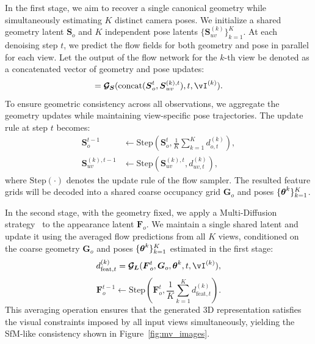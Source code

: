 \documentclass[../../book-main.tex]{subfiles}
\begin{document}
In the first stage, we aim to recover a single canonical geometry
while simultaneously estimating $K$ distinct camera poses. We
initialize a shared geometry latent $\boldsymbol{S}_{o}$ and $K$
independent pose latents $\{ \boldsymbol{S}_{uv}^{(k)} \}_{k=1}^K$.
At each denoising step $t$, we predict the flow fields for both
geometry and pose in parallel for each view. Let the output of the
flow network for the $k$-th view be denoted as a concatenated vector
of geometry and pose updates:
\begin{equation}
[d_{o, t}^{(k)}, d_{uv, t}^{(k)}] =
\sflow(\text{concat}(\boldsymbol{S}_{o}^t, \boldsymbol{S}_{uv}^{(k),
t}), t, \image^{(k)}).
\end{equation}
To ensure geometric consistency across all observations, we aggregate
the geometry updates while maintaining view-specific pose
trajectories. The update rule at step $t$ becomes:
\begin{align}
\boldsymbol{S}_{o}^{t-1} &\leftarrow
\text{Step}\left(\boldsymbol{S}_{o}^{t}, \frac{1}{K} \sum_{k=1}^K
d_{o, t}^{(k)}\right), \\
\boldsymbol{S}_{uv}^{(k), t-1} &\leftarrow
\text{Step}\left(\boldsymbol{S}_{uv}^{(k), t}, d_{uv, t}^{(k)}\right),
\end{align}
where $\text{Step}(\cdot)$ denotes the update rule of the flow
sampler. The resulted feature grids will be decoded into a shared
coarse occupancy grid $\boldsymbol{G}_o$ and poses $\{\boldsymbol{\theta}^{k}\}_{k=1}^{K}$.

In the second stage, with the geometry fixed, we apply a
Multi-Diffusion strategy~\citep{bar2023multidiffusion} to the
appearance latent $\boldsymbol{F}_{o}$. We maintain a single shared
latent and update it using the averaged flow predictions from all $K$
views, conditioned on the coarse geometry $\boldsymbol{G}_o$ and
poses $\{\boldsymbol{\theta}^{k}\}_{k=1}^{K}$ estimated in the first stage:
\begin{equation}
d_{\text{feat}, t}^{(k)} = \lflow(\boldsymbol{F}_{o}^t,
\boldsymbol{G}_o, \pose^{k}, t, \image^{(k)}),
\end{equation}
\begin{equation}
\boldsymbol{F}_{o}^{t-1} \leftarrow
\text{Step}\left(\boldsymbol{F}_{o}^{t}, \frac{1}{K} \sum_{k=1}^K
d_{\text{feat}, t}^{(k)}\right).
\end{equation}
This averaging operation ensures that the generated 3D representation
satisfies the visual constraints imposed by all input views
simultaneously, yielding the SfM-like consistency shown in
Figure~\ref{fig:mv_images}.
\end{document}
